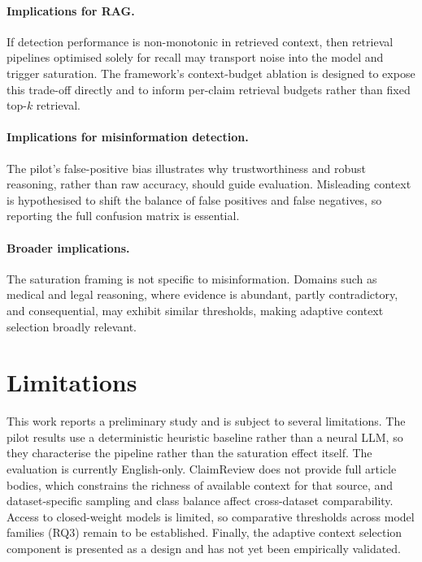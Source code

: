 \documentclass[11pt]{article}
\begin{document}
\paragraph{Implications for RAG.} If detection performance is non-monotonic in retrieved context, then retrieval pipelines optimised solely for recall may transport noise into the model and trigger saturation. The framework's context-budget ablation is designed to expose this trade-off directly and to inform per-claim retrieval budgets rather than fixed top-$k$ retrieval.

\paragraph{Implications for misinformation detection.} The pilot's false-positive bias illustrates why trustworthiness and robust reasoning, rather than raw accuracy, should guide evaluation. Misleading context is hypothesised to shift the balance of false positives and false negatives, so reporting the full confusion matrix is essential.

\paragraph{Broader implications.} The saturation framing is not specific to misinformation. Domains such as medical and legal reasoning, where evidence is abundant, partly contradictory, and consequential, may exhibit similar thresholds, making adaptive context selection broadly relevant.

\section{Limitations}
\label{sec:limitations}

This work reports a preliminary study and is subject to several limitations. The pilot results use a deterministic heuristic baseline rather than a neural LLM, so they characterise the pipeline rather than the saturation effect itself. The evaluation is currently English-only. ClaimReview does not provide full article bodies, which constrains the richness of available context for that source, and dataset-specific sampling and class balance affect cross-dataset comparability. Access to closed-weight models is limited, so comparative thresholds across model families (RQ3) remain to be established. Finally, the adaptive context selection component is presented as a design and has not yet been empirically validated.
\end{document}
